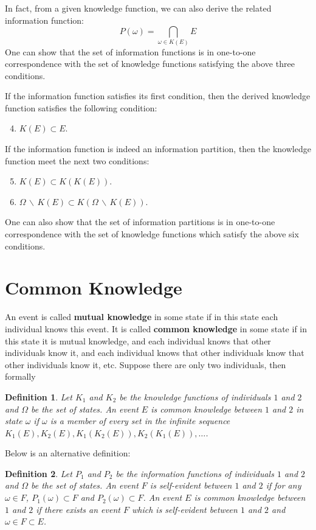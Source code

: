 \documentclass[openany]{book}
\newtheorem{definition}{Definition}[chapter]
\begin{document}
In fact, from a given knowledge function, we can also derive the related information function:
\begin{equation}
P(\omega)=\bigcap_{\omega\in K(E)}E
\end{equation}
One can show that the set of information functions is in one-to-one correspondence with the set of knowledge functions satisfying the above three conditions.

If the information function satisfies its first condition, then the derived knowledge function satisfies the following condition:
\begin{enumerate}\setcounter{enumi}{3}
\item $K(E)\subset E$.
\end{enumerate}

If the information function is indeed an information partition, then the knowledge function meet the next two conditions:
\begin{enumerate}\setcounter{enumi}{4}
\item $K(E)\subset K(K(E))$.
\item $\Omega\,\backslash\,K(E)\subset K(\Omega\,\backslash\,K(E))$.
\end{enumerate}
One can also show that the set of information partitions is in one-to-one correspondence with the set of knowledge functions which satisfy the above six conditions.

\section{Common Knowledge}
An event is called \textbf{mutual knowledge} in some state if in this state each individual knows this event. It is called \textbf{common knowledge} in some state if in this state it is mutual knowledge, and each individual knows that other individuals know it, and each individual knows that other individuals know that other individuals know it, etc. Suppose there are only two individuals, then formally
\begin{definition}
Let $K_1$ and $K_2$ be the knowledge functions of individuals $1$ and $2$ and $\Omega$ be the set of states. An event $E$ is common knowledge between $1$ and $2$ in state $\omega$ if $\omega$ is a member of every set in the infinite sequence $K_1(E),K_2(E),K_1(K_2(E)),K_2(K_1(E)),\ldots$.
\end{definition}
Below is an alternative definition:
\begin{definition}
Let $P_1$ and $P_2$ be the information functions of individuals $1$ and $2$ and $\Omega$ be the set of states. An event $F$ is self-evident between $1$ and $2$ if for any $\omega\in F$, $P_1(\omega)\subset F$ and $P_2(\omega)\subset F$. An event $E$ is common knowledge between $1$ and $2$ if there exists an event $F$ which is self-evident between $1$ and $2$ and $\omega\in F\subset E$.
\end{definition}
\end{document}
